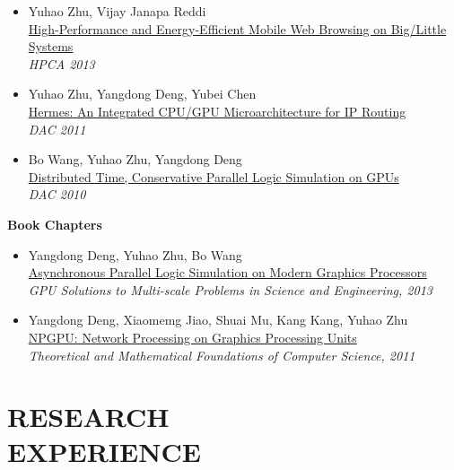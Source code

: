 \documentclass[margin, 9pt]{res} %
\begin{document}
\begin{resume}
\begin{itemize}[leftmargin=*]
	\item Yuhao Zhu, Vijay Janapa Reddi\\
          \href{http://yuhaozhu.com/pubs/hpca13.pdf}{High-Performance and Energy-Efficient Mobile Web Browsing on Big/Little Systems}\\
          \textit{HPCA 2013}

	\item Yuhao Zhu, Yangdong Deng, Yubei Chen\\
          \href{http://yuhaozhu.com/pubs/dac11.pdf}{Hermes: An Integrated CPU/GPU Microarchitecture for IP Routing}\\
          \textit{DAC 2011}

	\item Bo Wang, Yuhao Zhu, Yangdong Deng\\
          \href{http://yuhaozhu.com/pubs/dac10.pdf}{Distributed Time, Conservative Parallel Logic Simulation on GPUs}\\
          \textit{DAC 2010}
\end{itemize}
 
\vspace*{7pt}
{\large\textbf{Book Chapters}}

\begin{itemize}[leftmargin=*] \itemsep 0pt
	\item Yangdong Deng, Yuhao Zhu, Bo Wang\\
          \href{http://link.springer.com/chapter/10.1007/978-3-642-16405-7_32}{Asynchronous Parallel Logic Simulation on Modern Graphics Processors}\\
          \textit{GPU Solutions to Multi-scale Problems in Science and Engineering, 2013}

	\item Yangdong Deng, Xiaomemg Jiao, Shuai Mu, Kang Kang, Yuhao Zhu\\
          \href{http://link.springer.com/chapter/10.1007/978-3-642-24999-0_44}{NPGPU: Network Processing on Graphics Processing Units}\\
          \textit{Theoretical and Mathematical Foundations of Computer Science, 2011}
\end{itemize}


\section{RESEARCH\\ EXPERIENCE}


\end{resume}
\end{document}
